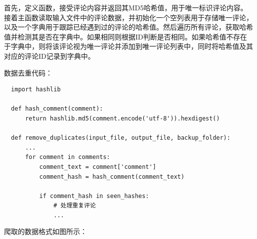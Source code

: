 \documentclass[UTF8,a4paper,15pt,titlepage,oneside]{ctexbook}
\begin{document}
首先，定义函数，接受评论内容并返回其MD5哈希值，用于唯一标识评论内容。接着主函数读取输入文件中的评论数据，并初始化一个空列表用于存储唯一评论，以及一个字典用于跟踪已经遇到过的评论的哈希值。然后遍历所有评论，获取哈希值并检测其是否在字典中。如果相同则根据ID判断是否相同。如果哈希值不存在于字典中，则将该评论视为唯一评论并添加到唯一评论列表中，同时将哈希值及其对应的评论ID记录到字典中。

数据去重代码：

\begin{mdframed}[backgroundcolor=darkgray, linecolor=lightgray, linewidth=1pt, innermargin=0.5cm, outermargin=0.5cm, skipbelow=0.1cm]
  \color{white}
  \begin{verbatim}
  import hashlib

  def hash_comment(comment):
      return hashlib.md5(comment.encode('utf-8')).hexdigest()
  
  def remove_duplicates(input_file, output_file, backup_folder):
      ...
      for comment in comments:
          comment_text = comment['comment']
          comment_hash = hash_comment(comment_text)
  
          if comment_hash in seen_hashes:
              # 处理重复评论
              ...
    \end{verbatim}
\vspace{-1.5em} %
\end{mdframed}


爬取的数据格式如图所示：
\end{document}
